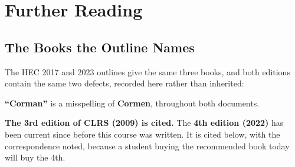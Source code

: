 \chapter{Further Reading}\label{app:resources}
\normalfigures

\section{The Books the Outline Names}

\begin{alertbox}
The HEC 2017 and 2023 outlines give the same three books, and both editions
contain the same two defects, recorded here rather than inherited:

\begin{tightnum}
  \item \textbf{``Corman''} is a misspelling of \textbf{Cormen}, throughout
        both documents.
  \item \textbf{The 3rd edition of CLRS (2009) is cited.} The \textbf{4th
        edition (2022)} has been current since before this course was written.
        It is cited below, with the correspondence noted, because a student
        buying the recommended book today will buy the 4th.
\end{tightnum}
\end{alertbox}

